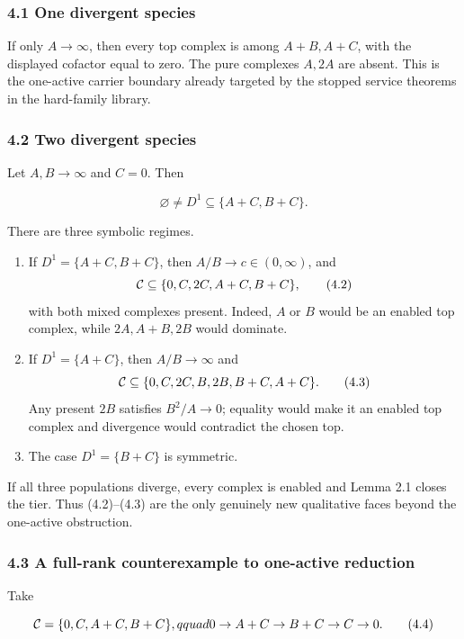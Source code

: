 \subsubsection{4.1 One divergent species}

If only \(A\to\infty\), then every top complex is among \(A+B,A+C\),
with the displayed cofactor equal to zero. The pure complexes \(A,2A\)
are absent. This is the one-active carrier boundary already targeted by
the stopped service theorems in the hard-family library.

\subsubsection{4.2 Two divergent species}

Let \(A,B\to\infty\) and \(C=0\). Then

\[
             \varnothing\ne D^1\subseteq\{A+C,B+C\}.          \tag{4.1}
\]

There are three symbolic regimes.

\begin{enumerate}
\def\labelenumi{\arabic{enumi}.}
\tightlist
\item
  If \(D^1=\{A+C,B+C\}\), then \(A/B\to c\in(0,\infty)\), and \[
         {\cal C}\subseteq\{0,C,2C,A+C,B+C\},               \tag{4.2}
  \] with both mixed complexes present. Indeed, \(A\) or \(B\) would be
  an enabled top complex, while \(2A,A+B,2B\) would dominate.
\item
  If \(D^1=\{A+C\}\), then \(A/B\to\infty\) and \[
      {\cal C}\subseteq
      \{0,C,2C,B,2B,B+C,A+C\}.                                \tag{4.3}
  \] Any present \(2B\) satisfies \(B^2/A\to0\); equality would make it
  an enabled top complex and divergence would contradict the chosen top.
\item
  The case \(D^1=\{B+C\}\) is symmetric.
\end{enumerate}

If all three populations diverge, every complex is enabled and Lemma 2.1
closes the tier. Thus (4.2)--(4.3) are the only genuinely new
qualitative faces beyond the one-active obstruction.

\subsubsection{4.3 A full-rank counterexample to one-active
reduction}

Take

\[
       {\cal C}=\{0,C,A+C,B+C\},qquad
       0\to A+C\to B+C\to C\to0.                              \tag{4.4}
\]

